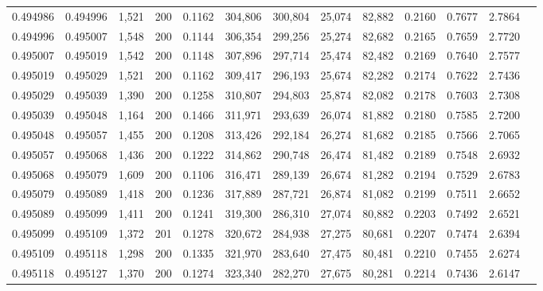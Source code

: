 \begin{tabular}{rrrrrrrrrrrrr}
0.494986 & 0.494996 & 1,521 & 200 &                                     0.1162 & 304,806 & 300,804 &  25,074 &  82,882 & 0.2160 & 0.7677 & 2.7864 \\
0.494996 & 0.495007 & 1,548 & 200 &                                     0.1144 & 306,354 & 299,256 &  25,274 &  82,682 & 0.2165 & 0.7659 & 2.7720 \\
0.495007 & 0.495019 & 1,542 & 200 &                                     0.1148 & 307,896 & 297,714 &  25,474 &  82,482 & 0.2169 & 0.7640 & 2.7577 \\
0.495019 & 0.495029 & 1,521 & 200 &                                     0.1162 & 309,417 & 296,193 &  25,674 &  82,282 & 0.2174 & 0.7622 & 2.7436 \\
0.495029 & 0.495039 & 1,390 & 200 &                                     0.1258 & 310,807 & 294,803 &  25,874 &  82,082 & 0.2178 & 0.7603 & 2.7308 \\
0.495039 & 0.495048 & 1,164 & 200 &                                     0.1466 & 311,971 & 293,639 &  26,074 &  81,882 & 0.2180 & 0.7585 & 2.7200 \\
0.495048 & 0.495057 & 1,455 & 200 &                                     0.1208 & 313,426 & 292,184 &  26,274 &  81,682 & 0.2185 & 0.7566 & 2.7065 \\
0.495057 & 0.495068 & 1,436 & 200 &                                     0.1222 & 314,862 & 290,748 &  26,474 &  81,482 & 0.2189 & 0.7548 & 2.6932 \\
0.495068 & 0.495079 & 1,609 & 200 &                                     0.1106 & 316,471 & 289,139 &  26,674 &  81,282 & 0.2194 & 0.7529 & 2.6783 \\
0.495079 & 0.495089 & 1,418 & 200 &                                     0.1236 & 317,889 & 287,721 &  26,874 &  81,082 & 0.2199 & 0.7511 & 2.6652 \\
0.495089 & 0.495099 & 1,411 & 200 &                                     0.1241 & 319,300 & 286,310 &  27,074 &  80,882 & 0.2203 & 0.7492 & 2.6521 \\
0.495099 & 0.495109 & 1,372 & 201 &                                     0.1278 & 320,672 & 284,938 &  27,275 &  80,681 & 0.2207 & 0.7474 & 2.6394 \\
0.495109 & 0.495118 & 1,298 & 200 &                                     0.1335 & 321,970 & 283,640 &  27,475 &  80,481 & 0.2210 & 0.7455 & 2.6274 \\
0.495118 & 0.495127 & 1,370 & 200 &                                     0.1274 & 323,340 & 282,270 &  27,675 &  80,281 & 0.2214 & 0.7436 & 2.6147 \\

\end{tabular}
